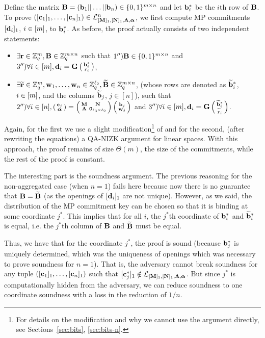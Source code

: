 Define the matrix $\mathbf{{B}}=(\mathbf{b}_1|| \ldots || \mathbf{b}_n) \in \{0,1\}^{{m} \times n}$ and let $\mathbf{b}_i^*$ be the $i$th row of $\mathbf{{B}}$. To prove $([\mathbf{c}_1]_1,\ldots, [\mathbf{c}_n]_1) \in\mathcal{L}_{[\mathbf{{M}}]_1,[\mathbf{{N}}]_1,\mathbf{{\Lambda}},{\boldsymbol \alpha}}^n$, we first compute MP commitments $[\mathbf{d}_i]_1$, $i \in [{m}]$, to $\mathbf{b}_i^*$.  As before, 
the proof actually consists of two independent statements:
\begin{itemize}
\item $\exists \mathbf{r} \in \mathbb{Z}_q^{m}, \mathbf{{B}} \in \mathbb{Z}_q^{{m} \times n}$ such that  
$1'') \mathbf{{B}} \in \{0,1\}^{{m} \times n}$ and $3'') \forall i \in [m], \mathbf{d}_i=\mathbf{{G}}\left(\begin{smallmatrix}\mathbf{b}_i^*  \\ r_i\end{smallmatrix}\right)$,
\item $\exists \widetilde{\mathbf{r}}\in\mathbb{Z}_q^{m}, \mathbf{w}_1,\ldots,\mathbf{w}_n \in\mathbb{Z}_q^{\ell_2}, \widetilde{\mathbf{{B}}} \in \mathbb{Z}_q^{{m} \times n}$, (whose rows are denoted as $\widetilde{\mathbf{b}}_i^*$, $i \in [{m}]$, and the columns $\widetilde{\mathbf{b}}_j$, $j \in [n]$), such that  
   $2'')\forall i\in[n], \left(\begin{smallmatrix}
    \mathbf{c}_j\\
    {\boldsymbol \alpha}
\end{smallmatrix}\right)
=
\left(\begin{smallmatrix}
    \mathbf{{M}}       & \mathbf{{N}}\\
    \mathbf{{\Lambda}} & \mathbf{{0}}_{{\ell_3}\times {\ell_2}}
\end{smallmatrix}\right)
\left(\begin{smallmatrix}
    \mathbf{b}_j\\
    \mathbf{w}_j
\end{smallmatrix}\right)$ and $3'') \forall i \in [{m}], \mathbf{d}_i=\mathbf{{G}}   \left(\begin{smallmatrix}\widetilde{\mathbf{b}}^*_i  \\ \widetilde{r}_i\end{smallmatrix}\right)$.
\end{itemize}
Again, for the first we use a slight modification\footnote{For details on the modification and why we cannot use the argument directly, see Sections~\ref{sec:bits}, \ref{sec:bits-n}.} of \cite{AC:GonHevRaf15} and for the second, (after rewriting the equations) a QA-NIZK argument for linear spaces. With this approach, the proof remains of size $\Theta(m)$, the size of the commitments, while the rest of the proof is constant. 

The interesting part is the soundness argument. The previous reasoning for the non-aggregated case (when $n=1$) fails here because now there is no guarantee that 
 $\mathbf{{B}}=\widetilde{\mathbf{{B}}}$ (as the openings of $[\mathbf{d}_i]_1$ are not unique).  However, as we said, the distribution of the MP commitment key can be chosen so that it is binding at some coordinate $j^*$. This implies that for all $i$, the $j^*$th coordinate of $\mathbf{b}_i^*$ and $\widetilde{\mathbf{b}}_i^*$ is equal, i.e. the $j^*$th column of $\mathbf{{B}}$ and $\widetilde{\mathbf{{B}}}$ must be equal.  

Thus, we have that for the coordinate $j^*$, the proof is sound (because $\mathbf{b}_j^*$ is uniquely determined, which was the uniqueness of openings which was necessary to prove soundness for $n=1$). That is, the adversary cannot break soundness for any tuple $([\mathbf{c}_1]_1,\ldots, [\mathbf{c}_n]_1)$ such that $[\mathbf{c}_j^*]_1 \notin \mathcal{L}_{[\mathbf{{M}}]_1,[\mathbf{{N}}]_1,\mathbf{{\Lambda}},{\boldsymbol \alpha}}$. But since $j^*$ is computationally hidden 
from the adversary, we can reduce soundness to one coordinate soundness with a loss in the reduction of $1/n$. 


